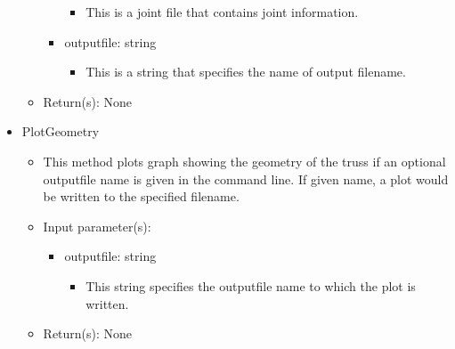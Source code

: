 \documentclass{article}
\begin{document}
\begin{itemize}
\begin{itemize}
\begin{itemize}
\begin{itemize}
\item This is a joint file that contains joint information.
\end{itemize}
\item outputfile: string
\begin{itemize}
\item This is a string that specifies the name of output filename.
\end{itemize}
\end{itemize}
\end{itemize}
\begin{itemize}
\item Return(s): None
\end{itemize}
\end{itemize}
\begin{itemize}
\item PlotGeometry
\begin{itemize}
\item This method plots graph showing the geometry of the truss if an optional outputfile name is given in the command line. If given name, a plot would be written to the specified filename.
\item Input parameter(s):
\begin{itemize}
\item outputfile: string
\begin{itemize}
\item This string specifies the outputfile name to which the plot is written. 
\end{itemize}
\end{itemize}
\item Return(s): None
\end{itemize}
\end{itemize}
\end{document}
